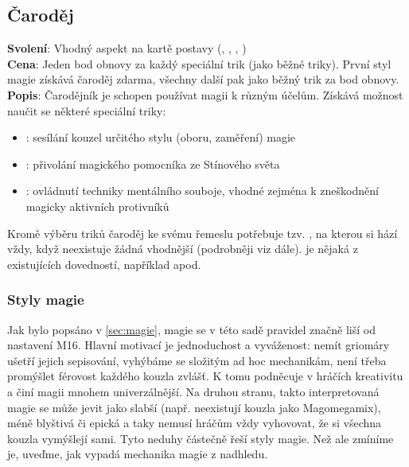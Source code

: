 \begin{tcolorbox}
\subsection{Čaroděj}
\label{sec:pov-carodej}
\textbf{Svolení}: Vhodný aspekt na kartě postavy (, , , )\\
\textbf{Cena}: Jeden bod obnovy za každý speciální trik (jako běžné triky). První styl magie získává čaroděj zdarma, všechny další pak jako běžný trik za bod obnovy.\\
\textbf{Popis}: Čarodějník je schopen používat magii k různým účelům. Získává možnost naučit se některé speciální triky:
\begin{itemize}
\item {}: sesílání kouzel určitého stylu (oboru, zaměření) magie
\item {}: přivolání magického pomocníka ze Stínového světa
\item {}: ovládnutí techniky mentálního souboje, vhodné zejména k zneškodnění magicky aktivních protivníků
\end{itemize}
Kromě výběru triků čaroděj ke svému řemeslu potřebuje tzv. , na kterou si hází vždy, když neexistuje žádná vhodnější (podrobněji viz dále).  je nějaká z existujících dovedností, například  apod. 
\end{tcolorbox}

\subsubsection*{Styly magie}
\label{stylymagie}

Jak bylo popsáno v \ref{sec:magie}, magie se v této sadě pravidel značně liší od nastavení M16. Hlavní motivací je jednoduchost a vyváženost: nemít griomáry ušetří jejich sepisování, vyhýbáme se složitým ad hoc mechanikám, není třeba promýšlet férovost každého kouzla zvlášť. K tomu podněcuje v hráčích kreativitu a činí magii mnohem univerzálnější. Na druhou stranu, takto interpretovaná magie se může jevit jako slabší (např. neexistují kouzla jako Magomegamix), méně blyštivá či epická a taky nemusí hráčům vždy vyhovovat, že si všechna kouzla vymýšlejí sami. Tyto neduhy částečně řeší styly magie. Než ale zmíníme je, uveďme, jak vypadá mechanika magie z nadhledu.\\

